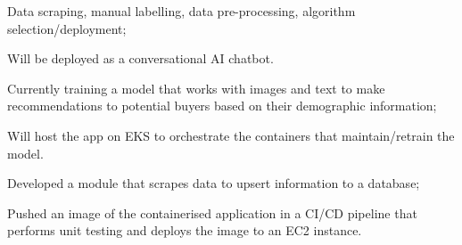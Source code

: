 \documentclass[]{plushcv}
\begin{document}
\begin{minipage}[t]{0.70\textwidth}
\begin{tightemize}
\item Data scraping, manual labelling, data pre-processing, algorithm selection/deployment;
\item Will be deployed as a conversational AI chatbot.
\end{tightemize}
\sectionsep

\begin{tightemize}
\item Currently training a model that works with images and text to make recommendations to potential buyers based on their demographic information;
\item Will host the app on EKS to orchestrate the containers that maintain/retrain the model.
\end{tightemize}
\sectionsep

\begin{tightemize}
\item Developed a module that scrapes data to upsert information to a database;
\item Pushed an image of the containerised application in a CI/CD pipeline that performs unit testing and deploys the image to an EC2 instance.
\end{tightemize}
\sectionsep



\end{minipage}
\end{document}
